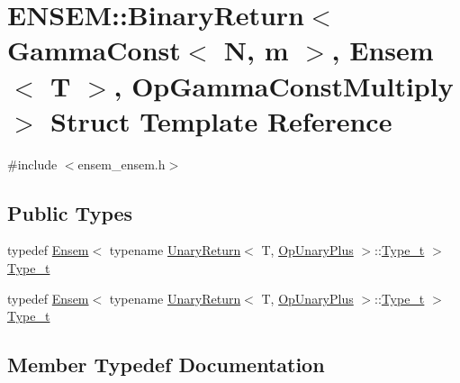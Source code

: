 \hypertarget{structENSEM_1_1BinaryReturn_3_01GammaConst_3_01N_00_01m_01_4_00_01Ensem_3_01T_01_4_00_01OpGammaConstMultiply_01_4}{}\section{E\+N\+S\+EM\+:\+:Binary\+Return$<$ Gamma\+Const$<$ N, m $>$, Ensem$<$ T $>$, Op\+Gamma\+Const\+Multiply $>$ Struct Template Reference}
\label{structENSEM_1_1BinaryReturn_3_01GammaConst_3_01N_00_01m_01_4_00_01Ensem_3_01T_01_4_00_01OpGammaConstMultiply_01_4}


{\ttfamily \#include $<$ensem\+\_\+ensem.\+h$>$}

\subsection*{Public Types}
\begin{DoxyCompactItemize}
\item 
typedef \mbox{\hyperlink{classENSEM_1_1Ensem}{Ensem}}$<$ typename \mbox{\hyperlink{structENSEM_1_1UnaryReturn}{Unary\+Return}}$<$ T, \mbox{\hyperlink{structENSEM_1_1OpUnaryPlus}{Op\+Unary\+Plus}} $>$\+::\mbox{\hyperlink{structENSEM_1_1BinaryReturn_3_01GammaConst_3_01N_00_01m_01_4_00_01Ensem_3_01T_01_4_00_01OpGammaConstMultiply_01_4_a8e262cef580a83da22ae92176027df7c}{Type\+\_\+t}} $>$ \mbox{\hyperlink{structENSEM_1_1BinaryReturn_3_01GammaConst_3_01N_00_01m_01_4_00_01Ensem_3_01T_01_4_00_01OpGammaConstMultiply_01_4_a8e262cef580a83da22ae92176027df7c}{Type\+\_\+t}}
\item 
typedef \mbox{\hyperlink{classENSEM_1_1Ensem}{Ensem}}$<$ typename \mbox{\hyperlink{structENSEM_1_1UnaryReturn}{Unary\+Return}}$<$ T, \mbox{\hyperlink{structENSEM_1_1OpUnaryPlus}{Op\+Unary\+Plus}} $>$\+::\mbox{\hyperlink{structENSEM_1_1BinaryReturn_3_01GammaConst_3_01N_00_01m_01_4_00_01Ensem_3_01T_01_4_00_01OpGammaConstMultiply_01_4_a8e262cef580a83da22ae92176027df7c}{Type\+\_\+t}} $>$ \mbox{\hyperlink{structENSEM_1_1BinaryReturn_3_01GammaConst_3_01N_00_01m_01_4_00_01Ensem_3_01T_01_4_00_01OpGammaConstMultiply_01_4_a8e262cef580a83da22ae92176027df7c}{Type\+\_\+t}}
\end{DoxyCompactItemize}


\subsection{Member Typedef Documentation}
\mbox{\label{structENSEM_1_1BinaryReturn_3_01GammaConst_3_01N_00_01m_01_4_00_01Ensem_3_01T_01_4_00_01OpGammaConstMultiply_01_4_a8e262cef580a83da22ae92176027df7c}} 

